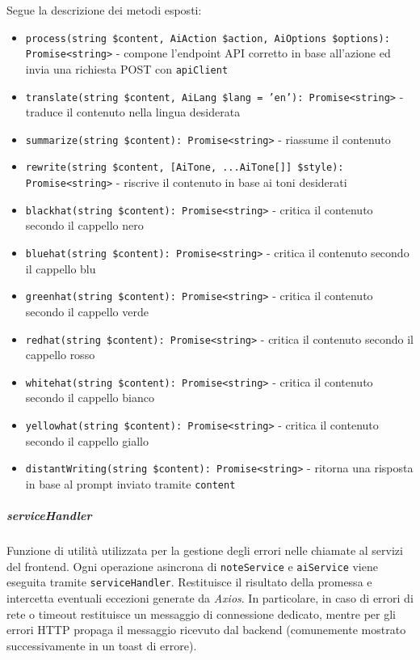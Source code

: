 \documentclass[a4paper,10pt]{article}
\begin{document}
Segue la descrizione dei metodi esposti:
\begin{itemize}
    \item \texttt{process(string \$content, AiAction \$action, AiOptions \$options): Promise<string>} - compone l'endpoint API corretto in base all'azione ed invia una richiesta POST con \texttt{apiClient}
    \item \texttt{translate(string \$content, AiLang \$lang = 'en'): Promise<string>} - traduce il contenuto nella lingua desiderata
    \item \texttt{summarize(string \$content): Promise<string>} - riassume il contenuto
    \item \texttt{rewrite(string \$content, [AiTone, ...AiTone[]] \$style): Promise<string>} - riscrive il contenuto in base ai toni desiderati
    \item \texttt{blackhat(string \$content): Promise<string>} - critica il contenuto secondo il cappello nero
    \item \texttt{bluehat(string \$content): Promise<string>} - critica il contenuto secondo il cappello blu
    \item \texttt{greenhat(string \$content): Promise<string>} - critica il contenuto secondo il cappello verde
    \item \texttt{redhat(string \$content): Promise<string>} - critica il contenuto secondo il cappello rosso
    \item \texttt{whitehat(string \$content): Promise<string>} - critica il contenuto secondo il cappello bianco
    \item \texttt{yellowhat(string \$content): Promise<string>} - critica il contenuto secondo il cappello giallo
    \item \texttt{distantWriting(string \$content): Promise<string>} - ritorna una risposta in base al prompt inviato tramite \texttt{content}
\end{itemize}
\subparagraph{serviceHandler} Funzione di utilità utilizzata per la gestione degli errori nelle chiamate al servizi del frontend. Ogni operazione asincrona di \texttt{noteService} e \texttt{aiService} viene eseguita tramite \texttt{serviceHandler}. Restituisce il risultato della promessa e intercetta eventuali eccezioni generate da \textit{Axios}. In particolare, in caso di errori di rete o timeout restituisce un messaggio di connessione dedicato, mentre per gli errori HTTP propaga il messaggio ricevuto dal backend (comunemente mostrato successivamente in un toast di errore).
\end{document}
